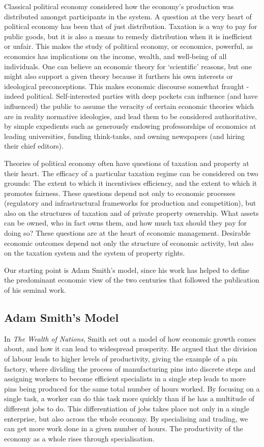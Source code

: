 \documentclass[]{tufte-handout}
\begin{document}
Classical political economy considered how the economy's production was
distributed amongst participants in the system. A question at the very
heart of political economy has been that of just distribution. Taxation
is a way to pay for public goods, but it is also a means to remedy
distribution when it is inefficient or unfair. This makes the study of
political economy, or economics, powerful, as economics has implications
on the income, wealth, and well-being of all individuals. One can
believe an economic theory for `scientific' reasons, but one might also
support a given theory because it furthers his own interests or
ideological preconceptions. This makes economic discourse somewhat
fraught - indeed political. Self-interested parties with deep pockets
can influence (and have influenced) the public to assume the veracity of
certain economic theories which are in reality normative ideologies, and
lead them to be considered authoritative, by simple expedients such as
generously endowing professorships of economics at leading universities,
funding think-tanks, and owning newspapers (and hiring their chief
editors).

Theories of political economy often have questions of taxation and
property at their heart. The efficacy of a particular taxation regime
can be considered on two grounds: The extent to which it incentivises
efficiency, and the extent to which it promotes fairness. These
questions depend not only to economic processes (regulatory and
infrastructural frameworks for production and competition), but also on
the structures of taxation and of private property ownership. What
assets can be owned, who in fact owns them, and how much tax should they
pay for doing so? These questions are at the heart of economic
management. Desirable economic outcomes depend not only the structure of
economic activity, but also on the taxation system and the system of
property rights.

Our starting point is Adam Smith's model, since his work has helped to
define the predominant economic view of the two centuries that followed
the publication of his seminal work.

\hypertarget{adam-smiths-model}{%
\subsection{Adam Smith's Model}\label{adam-smiths-model}}

In \emph{The Wealth of Nations}, Smith set out a model of how economic
growth comes about, and how it can lead to widespread prosperity. He
argued that the division of labour leads to higher levels of
productivity, giving the example of a pin factory, where dividing the
process of manufacturing pins into discrete steps and assigning workers
to become efficient specialists in a single step leads to more pins
being produced for the same total number of hours worked. By focusing on
a single task, a worker can do this task more quickly than if he has a
multitude of different jobs to do. This differentiation of jobs takes
place not only in a single enterprise, but also across the whole
economy. By specialising and trading, we can get more work done in a
given number of hours. The productivity of the economy as a whole rises
through specialisation.
\end{document}
